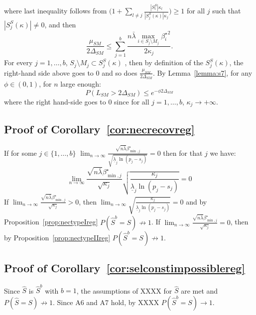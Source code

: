 \documentclass[aos]{imsart}
\theoremstyle{plain}
\begin{document}
where last inequality follows from $\Big(1+\sum_{l\neq j}\frac{|S_l^S|\kappa_l}{|S_j^{S}(\kappa)|\kappa_j}\Big)\geq 1$ for all $j$ such that $|S_j^{S}(\kappa)|\neq 0$, and then
$$\frac{\mu_{SM}}{2\Delta_{SM}}\leq \sum_{j=1}^b\frac{n\bar{\lambda}\max_{i\in S_j\setminus M_j}{\beta_i^{\star}}^2}{2\kappa_j}.$$
For every $j=1,\ldots,b$, $S_j\setminus M_j \subset S_j^{S}(\kappa)$ , then by definition of the $S_j^{S}(\kappa)$, the right-hand 
side above goes to 0 and so does $\frac{\mu_{SM}}{2\Delta_{SM}}$. By Lemma~\ref{lemma:s7}, for any $\phi \in (0,1)$, for $n$ large enough:
\begin{equation}
    P(L_{SM}> 2\Delta_{SM}) \leq e^{-\phi2\Delta_{SM}}
\end{equation} 
where the right hand-side goes to 0 since for all $j=1,\ldots,b$, $\kappa_j \to +\infty$. 

\subsection{Proof of Corollary~\ref{cor:necrecovreg}}
If for some $j\in\{1,\ldots,b\}$ $\lim_{n\to\infty}\frac{\sqrt{n\bar{\lambda}}\beta_{\min,j}^{\star}}{\sqrt{\underline{\lambda}_j\ln(p_j-s_j)}} = 0$ then for that $j$ we have:
$$\lim_{n\to\infty}\frac{\sqrt{n\bar{\lambda}}\beta_{\min,j}^{\star}}{\sqrt{\kappa_j}}\sqrt{\frac{\kappa_j}{\underline{\lambda}_j\ln(p_j-s_j)}} = 0$$
If $\lim_{n\to\infty}\frac{\sqrt{n\bar{\lambda}}\beta_{\min,j}^{\star}}{\sqrt{\kappa_j}}>0$, then $\lim_{n\to\infty}\sqrt{\frac{\kappa_j}{\underline{\lambda}_j\ln(p_j-s_j)}} = 0$ and by Proposition~\ref{prop:nectypeIreg} $P(\hat{S}^b=S)\not\to1$. If $\lim_{n\to\infty}\frac{\sqrt{n\bar{\lambda}}\beta_{\min,j}^{\star}}{\sqrt{\kappa_j}}=0$, then by Proposition~\ref{prop:nectypeIIreg} $P(\hat{S}^b=S)\not\to1$.

\subsection{Proof of Corollary~\ref{cor:selconstimpossiblereg}}

Since $\hat{S}$ is $\hat{S}^b$ with $b=1$, the assumptions of XXXX for $\hat{S}$ are met and $P(\hat{S} = S)\not \to 1$. Since A6 and A7 hold, by XXXX $P(\hat{S}^b = S)\to 1$.
\end{document}
